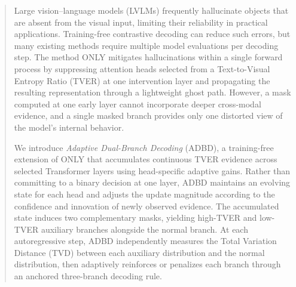 \begin{abstract}
Large vision--language models (LVLMs) frequently hallucinate objects that are absent from the visual input, limiting their reliability in practical applications. Training-free contrastive decoding can reduce such errors, but many existing methods require multiple model evaluations per decoding step. The method ONLY mitigates hallucinations within a single forward process by suppressing attention heads selected from a Text-to-Visual Entropy Ratio (TVER) at one intervention layer and propagating the resulting representation through a lightweight ghost path. However, a mask computed at one early layer cannot incorporate deeper cross-modal evidence, and a single masked branch provides only one distorted view of the model's internal behavior.

We introduce \emph{Adaptive Dual-Branch Decoding} (ADBD), a training-free extension of ONLY that accumulates continuous TVER evidence across selected Transformer layers using head-specific adaptive gains. Rather than committing to a binary decision at one layer, ADBD maintains an evolving state for each head and adjusts the update magnitude according to the confidence and innovation of newly observed evidence. The accumulated state induces two complementary masks, yielding high-TVER and low-TVER auxiliary branches alongside the normal branch. At each autoregressive step, ADBD independently measures the Total Variation Distance (TVD) between each auxiliary distribution and the normal distribution, then adaptively reinforces or penalizes each branch through an anchored three-branch decoding rule.
\end{abstract}

